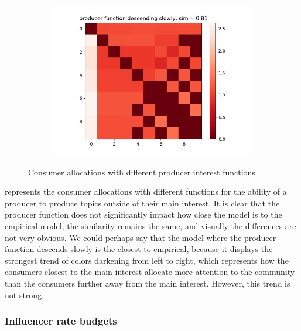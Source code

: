 \documentclass[11pt, letterpaper]{article}
\begin{document}
\begin{figure}[h]
\begin{adjustbox}{max width=1.5\textwidth,center}
\begin{subfigure}[b]{0.45\textwidth}
        \includegraphics[width=\linewidth]{"figures/g/descending slowly_heatmap.jpg"}
    \end{subfigure}
\end{adjustbox}
\caption{Consumer allocations with different producer interest functions}
\label{fig:g_heatmap}
\end{figure}

 represents the consumer allocations with different functions for the ability of a producer to produce topics outside of their main interest. It is clear that the producer function does not significantly impact how close the model is to the empirical model; the similarity remains the same, and visually the differences are not very obvious. We could perhaps say that the model where the producer function descends slowly is the closest to empirical, because it displays the strongest trend of colors darkening from left to right, which represents how the consumers closest to the main interest allocate more attention to the community than the consumers further away from the main interest. However, this trend is not strong.

\subsubsection{Influencer rate budgets}\label{sss:M_INFL}
\end{document}
